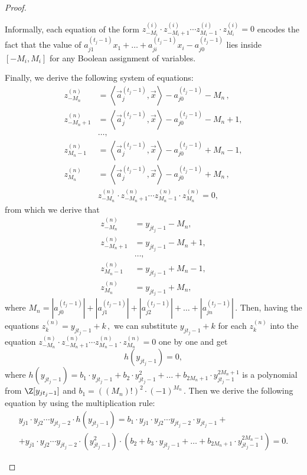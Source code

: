 \documentclass{toc}
\begin{document}
\begin{proof}
\begin{itemize}
Informally, each equation of the form $z_{-M_i}^{(i)} \cdot z_{-M_i + 1}^{(i)}  \cdots z_{M_i - 1}^{(i)} \cdot z_{M_i}^{(i)} = 0$ encodes the fact that the value of $a_{j 1}^{(t_j - 1)}x_1  + \ldots + a_{j i}^{(t_j - 1)}x_i - a_{j 0}^{(t_j - 1)}$ lies inside $[-M_i, M_i]$ for any Boolean assignment of variables.

Finally, we derive the following system of equations:
\begin{align*}
%
%
z_{-M_n}^{(n)} &= \left\langle \vec a_j^{(t_j - 1)}, \vec x \right \rangle - a_{j 0}^{(t_j - 1)} - M_n\,, \\
z_{-M_n + 1}^{(n)} &=\left\langle \vec a_j^{(t_j - 1)}, \vec x \right \rangle - a_{j 0}^{(t_j - 1)} - M_n + 1, \\
&\ldots, \\
z_{M_n - 1}^{(n)} &= \left\langle \vec a_j^{(t_j - 1)}, \vec x \right \rangle - a_{j 0}^{(t_j - 1)} + M_n - 1, \\
z_{M_n}^{(n)} &= \left\langle \vec a_j^{(t_j - 1)}, \vec x \right \rangle - a_{j 0}^{(t_j - 1)} + M_n\,, \\
&z_{-M_n}^{(n)} \cdot z_{-M_n + 1}^{(n)}  \cdots z_{M_n - 1}^{(n)} \cdot z_{M_n}^{(n)} = 0,
\end{align*}
from which we derive that
\begin{align*}
%
z_{-M_n}^{(n)} &= y_{j t_j - 1} - M_n, \\  z_{-M_n + 1}^{(n)} &= y_{j t_j - 1} - M_n + 1,  \\ &\ldots, \\ z_{M_n - 1}^{(n)} &= y_{j t_j - 1} + M_n - 1, \\ z_{M_n}^{(n)} &=  y_{j t_j - 1} + M_n, %
\end{align*}
%
where %
$M_n = |a_{j 0}^{(t_j - 1)}| + |a_{j 1}^{(t_j - 1)}| + |a_{j 2}^{(t_j - 1)}| + \ldots + |a_{j n}^{(t_j - 1)}|\,.$ %
 Then, having the equations %
$z_{k}^{(n)} = y_{j t_j - 1} + k\,,$ %
 we can substitute $y_{j t_j - 1} + k$ for each $z_{k}^{(n)}$ into the equation $z_{-M_n}^{(n)} \cdot z_{-M_n + 1}^{(n)}  \cdots z_{M_n - 1}^{(n)} \cdot z_{M_n}^{(n)} = 0$ one by one and get %
    $$
    h(y_{j t_j - 1}) = 0, %
    $$
    where $h(y_{j t_j - 1}) = b_1 \cdot y_{j t_j - 1} + b_2 \cdot y_{j t_j - 1}^2 + \ldots +  b_{2 M_n + 1} \cdot y_{j t_j - 1}^{2 M_n + 1} $ is a polynomial from $\Z[y_{j t_j - 1}]$ and %
$b_1 = ((M_n)!)^2 \cdot (-1)^{M_n}\,.$ %
 Then we derive the following equation by using the multiplication rule: %
    \begin{multline*}
      y_{j 1} \cdot y_{j 2} \cdots y_{j t_j - 2} \cdot h(y_{j t_j - 1}) = b_1 \cdot y_{j 1} \cdot y_{j 2} \cdots y_{j t_j - 2} \cdot y_{j t_j - 1} + \\ + y_{j 1} \cdot y_{j 2} \cdots y_{j t_j - 2} \cdot (y_{j t_j - 1}^2) \cdot (b_2 + b_3 \cdot y_{j t_j - 1} + \ldots +  b_{2 M_n + 1} \cdot y_{j t_j - 1}^{2 M_n - 1}) =  0. %

\end{multline*}
\end{itemize}
\end{proof}
\end{document}
